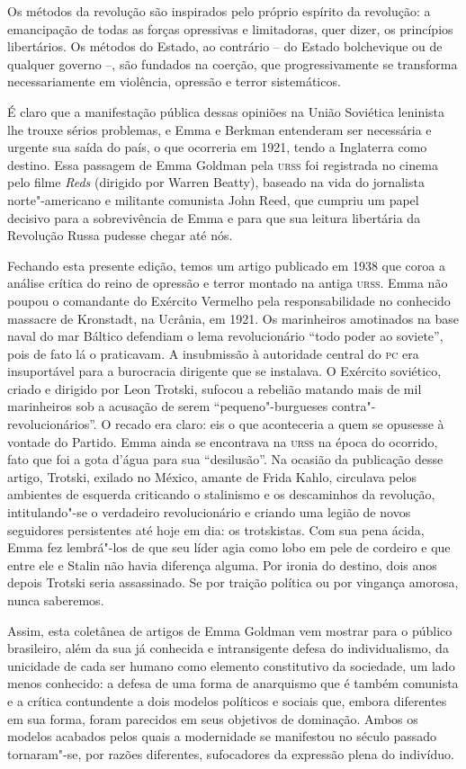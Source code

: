 Os métodos da revolução são inspirados pelo próprio espírito da
revolução: a emancipação de todas as forças opressivas e limitadoras,
quer dizer, os princípios libertários. Os métodos do Estado, ao
contrário – do Estado bolchevique ou de qualquer governo –, são fundados
na coerção, que progressivamente se transforma necessariamente em
violência, opressão e terror sistemáticos.

É claro que a manifestação pública dessas opiniões na União
Soviética leninista lhe trouxe sérios problemas, e Emma e Berkman
entenderam ser necessária e urgente sua saída do país, o que ocorreria
em 1921, tendo a Inglaterra como destino. Essa passagem de Emma Goldman
pela \textsc{urss} foi registrada no cinema pelo filme \textit{Reds} (dirigido por Warren
Beatty), baseado na vida do jornalista norte"-americano e militante
comunista John Reed, que cumpriu um papel decisivo para a sobrevivência
de Emma e para que sua leitura libertária da Revolução Russa pudesse
chegar até nós.

Fechando esta presente edição, temos um artigo publicado em 1938 que
coroa a análise crítica do reino de opressão e terror montado na antiga
\textsc{urss}. Emma não poupou o comandante do Exército Vermelho pela
responsabilidade no conhecido massacre de Kronstadt, na Ucrânia, em
1921. Os marinheiros amotinados na base naval do mar Báltico defendiam
o lema revolucionário “todo poder ao soviete”, pois de fato lá o
praticavam. A insubmissão à autoridade central do \textsc{pc} era insuportável
para a burocracia dirigente que se instalava. O Exército soviético,
criado e dirigido por Leon Trotski, sufocou a rebelião matando mais de 
mil marinheiros sob a acusação de serem “pequeno"-burgueses
contra"-revolucionários”. O recado era claro: eis o que aconteceria a
quem se opusesse à vontade do Partido. Emma ainda se encontrava na \textsc{urss}
na época do ocorrido, fato que foi a gota d’água para sua “desilusão”. Na
ocasião da publicação desse artigo, Trotski, exilado no México, amante
de Frida Kahlo, circulava pelos ambientes de esquerda criticando o
stalinismo e os descaminhos da revolução, intitulando"-se o verdadeiro
revolucionário e criando uma legião de novos seguidores persistentes
até hoje em dia: os trotskistas. Com sua pena ácida, Emma fez
lembrá"-los de que seu líder agia como lobo em pele de cordeiro e que
entre ele e Stalin não havia diferença alguma. Por ironia do destino,
dois anos depois Trotski seria assassinado. Se por traição política ou
por vingança amorosa, nunca saberemos.

Assim, esta coletânea de artigos de Emma Goldman vem mostrar para o
público brasileiro, além da sua já conhecida e intransigente defesa do
individualismo, da unicidade de cada ser humano como elemento
constitutivo da sociedade, um lado menos conhecido: a defesa de uma
forma de anarquismo que é também comunista e a crítica contundente a
dois modelos políticos e sociais que, embora diferentes em sua forma,
foram parecidos em
seus objetivos de dominação. Ambos os modelos acabados pelos quais a
modernidade se manifestou no século passado tornaram"-se, por razões
diferentes, sufocadores da expressão plena do indivíduo. 

